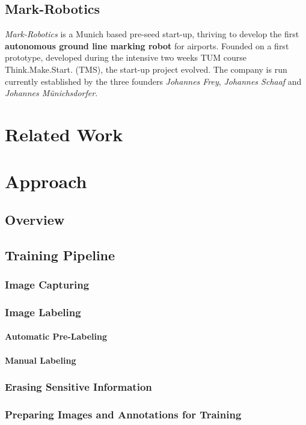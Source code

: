 \section{Mark-Robotics}
\label{sec:mark-robotics}

\emph{Mark-Robotics} is a Munich based pre-seed start-up, thriving to develop the first \textbf{autonomous ground line marking robot} for airports. Founded on a first prototype, developed during the intensive two weeks TUM course Think.Make.Start. (TMS), the start-up project evolved. The company is run currently established by the three founders \emph{Johannes Frey}, \emph{Johannes Schaaf} and \emph{Johannes Münichsdorfer}.

\chapter{Related Work}
\label{ch:related-work}

\chapter{Approach}
\label{ch:approach}

\section{Overview}

\section{Training Pipeline}
\subsection{Image Capturing}
\subsection{Image Labeling}
\subsubsection{Automatic Pre-Labeling}
\subsubsection{Manual Labeling}
\subsection{Erasing Sensitive Information}
\subsection{Preparing Images and Annotations for Training}
